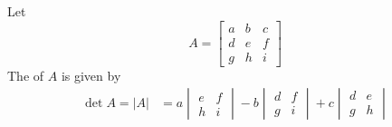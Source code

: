 \documentclass{ximera}
\begin{document}
\begin{definition}\label{def:threebythreedet}
Let
$$A=\begin{bmatrix}a&b&c\\d&e&f\\g&h&i\end{bmatrix}$$
The  of $A$ is given by
\begin{align}\label{eq:det3by3}
\det{A}=|A|&=a\begin{vmatrix}e&f\\h&i\end{vmatrix}-b\begin{vmatrix}d&f\\g&i\end{vmatrix}+c\begin{vmatrix}d&e\\g&h\end{vmatrix}
\end{align}
\end{definition}
\end{document}
